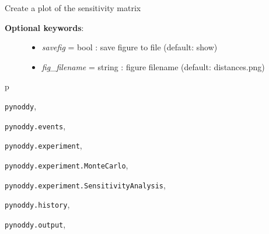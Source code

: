 \documentclass[a4paper,10pt,english]{sphinxmanual}
\begin{document}
\begin{fulllineitems}
\begin{fulllineitems}
\begin{description}
\begin{itemize}
\end{itemize}

\end{description}

\end{fulllineitems}


\begin{fulllineitems}
\label{pynoddy:pynoddy.experiment.SensitivityAnalysis.SensitivityAnalysis.plot_sensitivity_matrix}
Create a plot of the sensitivity matrix
\begin{description}
\item[{\textbf{Optional keywords}:}] \leavevmode\begin{itemize}
\item {} 
\emph{savefig} = bool : save figure to file (default: show)

\item {} 
\emph{fig\_filename} = string : figure filename (default: distances.png)

\end{itemize}

\end{description}

\end{fulllineitems}


\end{fulllineitems}



\renewcommand{\indexname}{Python Module Index}
\begin{theindex}
\def\bigletter#1{{\Large\sffamily#1}\nopagebreak\vspace{1mm}}
\bigletter{p}
\item {\texttt{pynoddy}}, \pageref{pynoddy:module-pynoddy}
\item {\texttt{pynoddy.events}}, \pageref{pynoddy:module-pynoddy.events}
\item {\texttt{pynoddy.experiment}}, \pageref{pynoddy:module-pynoddy.experiment}
\item {\texttt{pynoddy.experiment.MonteCarlo}}, \pageref{pynoddy:module-pynoddy.experiment.MonteCarlo}
\item {\texttt{pynoddy.experiment.SensitivityAnalysis}}, \pageref{pynoddy:module-pynoddy.experiment.SensitivityAnalysis}
\item {\texttt{pynoddy.history}}, \pageref{pynoddy:module-pynoddy.history}
\item {\texttt{pynoddy.output}}, \pageref{pynoddy:module-pynoddy.output}
\end{theindex}

\renewcommand{\indexname}{Index}
\printindex
\end{document}
